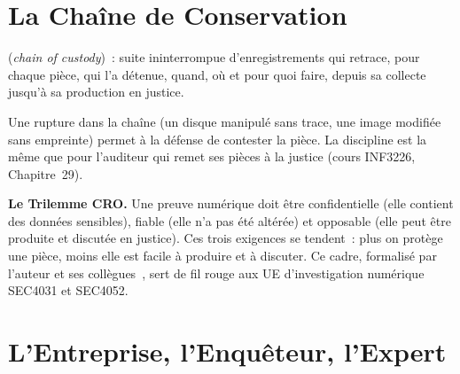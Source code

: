 \section{La Chaîne de Conservation}
\label{sec:c24-chaine}

\begin{boxdef}
 (\textit{chain of custody})~: suite
ininterrompue d'enregistrements qui retrace, pour chaque pièce, qui l'a
détenue, quand, où et pour quoi faire, depuis sa collecte jusqu'à sa
production en justice.
\end{boxdef}

Une rupture dans la chaîne (un disque manipulé sans trace, une image
modifiée sans empreinte) permet à la défense de contester la pièce. La
discipline est la même que pour l'auditeur qui remet ses pièces à la
justice (cours INF3226, Chapitre~29).

\begin{boxinfo}
\textbf{Le Trilemme CRO.} Une preuve numérique doit être confidentielle
(elle contient des données sensibles), fiable (elle n'a pas été
altérée) et opposable (elle peut être produite et discutée en justice).
Ces trois exigences se tendent~: plus on protège une pièce, moins elle est
facile à produire et à discuter. Ce cadre, formalisé par l'auteur et ses
collègues~\cite{minka2025cro}, sert de fil rouge aux UE d'investigation
numérique SEC4031 et SEC4052.
\end{boxinfo}

\section{L'Entreprise, l'Enquêteur, l'Expert}
\label{sec:c24-roles}

